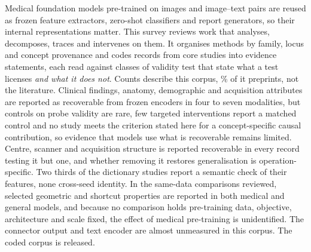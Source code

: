 Medical foundation models pre-trained on images and image--text pairs are reused as frozen feature
extractors, zero-shot classifiers and report generators, so their internal representations matter. This survey reviews work that analyses, decomposes, traces and
intervenes on them. It organises methods by
family, locus and concept provenance and codes \Nclaims{} records from \Ncore{} core studies into \Fnrows{}
evidence statements, each read against \Vnclasses{} classes of validity test that state what a test
licenses \emph{and what it does not}. Counts describe this corpus, \Pctpreprint\% of it preprints, not the literature. Clinical findings, anatomy, demographic and acquisition
attributes are reported as recoverable from frozen encoders in four to seven modalities, but controls on
probe validity are rare, few targeted interventions report a matched control and no study meets the criterion
stated here for a concept-specific causal contribution, so evidence that models use what is recoverable
remains limited. Centre, scanner and acquisition
structure is reported recoverable in every record testing it but one, and whether removing it restores
generalisation is operation-specific. Two thirds of the dictionary studies report a semantic check of their
features, none cross-seed identity. In the same-data
comparisons reviewed, selected geometric and shortcut properties are reported in both medical and general
models, and because no comparison holds pre-training data, objective, architecture and scale fixed, the effect of
medical pre-training is unidentified.
The connector output and text encoder are almost unmeasured in this corpus. The coded corpus is released.
